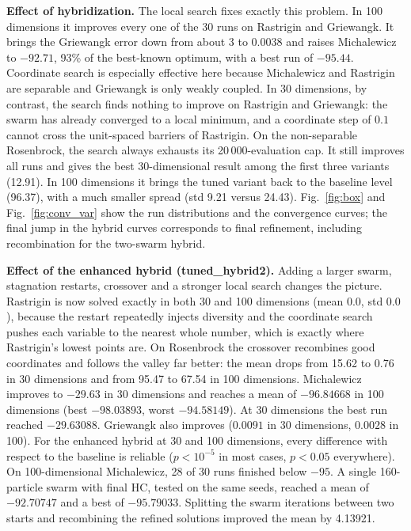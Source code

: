 \documentclass[conference]{IEEEtran}
\begin{document}
\textbf{Effect of hybridization.} The local search fixes exactly this
problem. In 100 dimensions it improves every one of the 30 runs on
Rastrigin and Griewangk. It brings the Griewangk error down
from about 3 to 0.0038 and raises Michalewicz to $-92.71$, 93\% of the
best-known optimum, with a best run of $-95.44$. Coordinate search is
especially effective here because Michalewicz and Rastrigin are separable
and Griewangk is only weakly coupled. In 30 dimensions, by contrast, the
search finds nothing to improve on Rastrigin and Griewangk: the swarm has
already converged to a local minimum, and a coordinate step of $0.1$ cannot
cross the unit-spaced barriers of Rastrigin. On the non-separable
Rosenbrock, the search always exhausts its 20\,000-evaluation cap. It still
improves all runs and gives the best 30-dimensional result among the first
three variants (12.91). In 100 dimensions it brings the tuned variant back
to the baseline level (96.37), with a much smaller spread (std 9.21 versus
24.43). Fig.~\ref{fig:box} and Fig.~\ref{fig:conv_var} show the run
distributions and the convergence curves; the final jump in the hybrid
curves corresponds to final refinement, including recombination for the two-swarm hybrid.

\textbf{Effect of the enhanced hybrid (tuned\_hybrid2).} Adding a larger
swarm, stagnation restarts, crossover and a stronger local search changes
the picture. Rastrigin is now solved exactly in both 30 and 100 dimensions
(mean $0.0$, std $0.0$), because the restart repeatedly injects diversity
and the coordinate search pushes each variable to the nearest whole number,
which is exactly where Rastrigin's lowest points are. On Rosenbrock the
crossover recombines good coordinates and follows the valley far better:
the mean drops from 15.62 to 0.76 in 30 dimensions and from 95.47 to 67.54
in 100 dimensions. Michalewicz improves to $-29.63$ in 30 dimensions and
reaches a mean of $-96.84668$ in 100 dimensions (best $-98.03893$, worst $-94.58149$). At 30 dimensions the best run reached $-29.63088$. Griewangk also improves ($0.0091$ in 30 dimensions, $0.0028$ in
100). For the enhanced hybrid at 30 and 100 dimensions, every difference with respect to the baseline is reliable
($p<10^{-5}$ in most cases, $p<0.05$ everywhere). On 100-dimensional Michalewicz, 28 of 30 runs finished below $-95$.
A single 160-particle swarm with final HC, tested on the same seeds, reached
a mean of $-92.70747$ and a best of $-95.79033$. Splitting the swarm
iterations between two starts and recombining the refined solutions
improved the mean by 4.13921.
\end{document}
